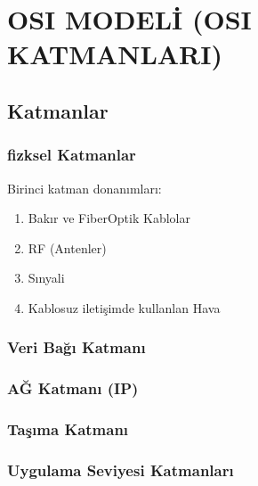 \section{OSI MODELİ (OSI KATMANLARI)}

\subsection{Katmanlar}

\subsubsection{fizksel Katmanlar}

Birinci katman donanımları:
\begin{enumerate}
\item Bakır ve FiberOptik Kablolar
\item RF (Antenler)
\item Sınyali 
\item Kablosuz iletişimde kullanlan Hava 
\end{enumerate}

\subsubsection{Veri Bağı Katmanı}


\subsubsection{AĞ Katmanı (IP) }

\subsubsection{Taşıma Katmanı}

\subsubsection{Uygulama Seviyesi Katmanları}

